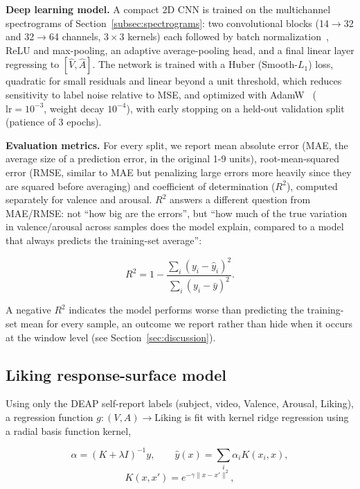 \documentclass[conference]{IEEEtran}
\begin{document}
\textbf{Deep learning model.} A compact 2D CNN is trained on the
multichannel spectrograms of Section~\ref{subsec:spectrograms}:
two convolutional blocks (14$\to$32 and 32$\to$64 channels, $3\times3$
kernels) each followed by batch normalization~\cite{ioffe2015batchnorm},
ReLU and max-pooling, an adaptive average-pooling head, and a final linear
layer regressing to $[\hat V, \hat A]$. The network is trained with a
Huber (Smooth-$L_1$) loss, quadratic for small residuals and linear
beyond a unit threshold, which reduces sensitivity to label noise relative
to MSE, and optimized with
AdamW~\cite{loshchilov2019adamw} ($\text{lr}=10^{-3}$,
weight decay $10^{-4}$), with early stopping on a held-out validation
split (patience of 3 epochs).

\textbf{Evaluation metrics.} For every split, we report mean absolute
error (MAE, the average size of a prediction error, in the original 1-9
units), root-mean-squared error (RMSE, similar to MAE but penalizing large
errors more heavily since they are squared before averaging) and
coefficient of determination ($R^2$), computed separately for valence and
arousal. $R^2$ answers a different question from MAE/RMSE: not ``how big
are the errors'', but ``how much of the true variation in valence/arousal
across samples does the model explain, compared to a model that always
predicts the training-set average''\@:

\begin{equation}
R^2 = 1 - \frac{\sum_i (y_i - \hat y_i)^2}{\sum_i (y_i - \bar y)^2}.
\label{eq:r2}
\end{equation}

A negative $R^2$ indicates the model performs worse than predicting the
training-set mean for every sample, an outcome we report rather than
hide when it occurs at the window level (see Section~\ref{sec:discussion}).

\subsection{Liking response-surface model}
\label{subsec:liking}

Using only the DEAP self-report labels (subject, video, Valence, Arousal,
Liking), a regression function $g: (V, A) \rightarrow \text{Liking}$ is
fit with kernel ridge regression using a radial basis function kernel,

\begin{equation}
\alpha = (K + \lambda I)^{-1} y, \qquad
\hat y(x) = \sum_i \alpha_i K(x_i, x),
\label{eq:kernelridge}
\end{equation}
\begin{equation}
K(x,x') = e^{-\gamma \lVert x - x' \rVert^2},
\label{eq:rbf}
\end{equation}
\end{document}
